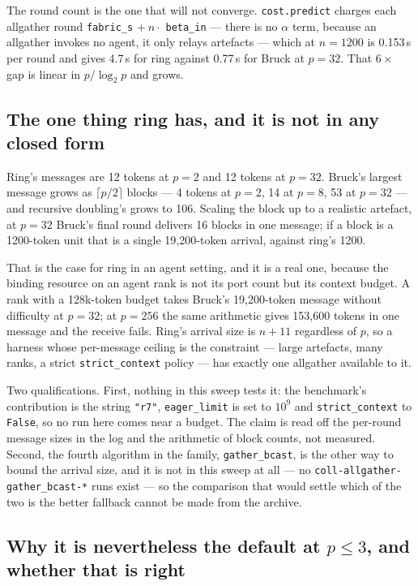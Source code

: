 \documentclass[11pt]{article}
\begin{document}
The round count is the one that will not converge. \texttt{cost.predict} charges each allgather
round \texttt{fabric\_s} $+\ n \cdot$ \texttt{beta\_in} --- there is no $\alpha$ term, because an
allgather invokes no agent, it only relays artefacts --- which at $n=1200$ is 0.153\,s per round
and gives 4.7\,s for ring against 0.77\,s for Bruck at $p=32$. That $6\times$ gap is linear in
$p/\log_2 p$ and grows.

\subsection{The one thing ring has, and it is not in any closed form}

Ring's messages are 12 tokens at $p=2$ and 12 tokens at $p=32$. Bruck's largest message grows as
$\lceil p/2 \rceil$ blocks --- 4 tokens at $p=2$, 14 at $p=8$, 53 at $p=32$ --- and recursive
doubling's grows to 106. Scaling the block up to a realistic artefact, at $p=32$ Bruck's final
round delivers 16 blocks in one message; if a block is a 1200-token unit that is a single
19{,}200-token arrival, against ring's 1200.

That is the case for ring in an agent setting, and it is a real one, because the binding resource
on an agent rank is not its port count but its context budget. A rank with a 128k-token budget
takes Bruck's 19{,}200-token message without difficulty at $p=32$; at $p=256$ the same arithmetic
gives 153{,}600 tokens in one message and the receive fails. Ring's arrival size is
$n + 11$ regardless of $p$, so a harness whose per-message ceiling is the constraint --- large
artefacts, many ranks, a strict \texttt{strict\_context} policy --- has exactly one allgather
available to it.

Two qualifications. First, nothing in this sweep tests it: the benchmark's contribution is the
string \texttt{"r7"}, \texttt{eager\_limit} is set to $10^9$ and \texttt{strict\_context} to
\texttt{False}, so no run here comes near a budget. The claim is read off the per-round message
sizes in the log and the arithmetic of block counts, not measured. Second, the fourth algorithm in
the family, \texttt{gather\_bcast}, is the other way to bound the arrival size, and it is not in
this sweep at all --- no \texttt{coll-allgather-gather\_bcast-*} runs exist --- so the comparison
that would settle which of the two is the better fallback cannot be made from the archive.

\subsection{Why it is nevertheless the default at $p \le 3$, and whether that is right}
\end{document}
